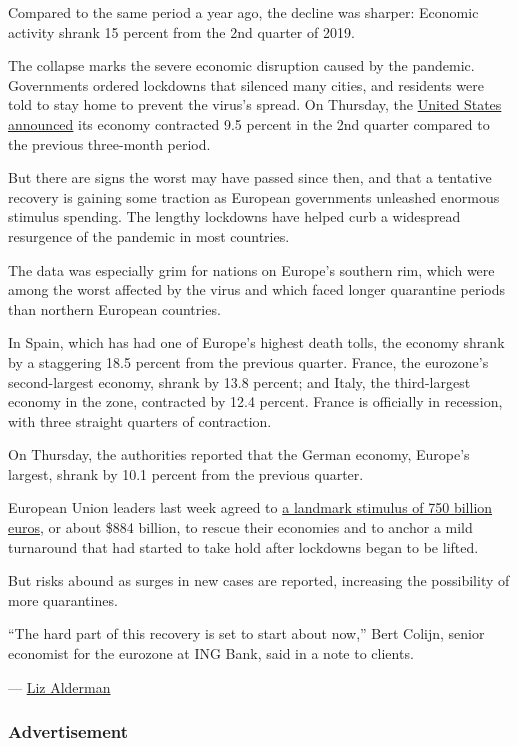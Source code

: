 Compared to the same period a year ago, the decline was sharper:
Economic activity shrank 15 percent from the 2nd quarter of 2019.

The collapse marks the severe economic disruption caused by the
pandemic. Governments ordered lockdowns that silenced many cities, and
residents were told to stay home to prevent the virus's spread. On
Thursday, the
\href{https://www.nytimes.com/2020/07/30/business/economy/q2-gdp-coronavirus-economy.html}{United
States announced} its economy contracted 9.5 percent in the 2nd quarter
compared to the previous three-month period.

But there are signs the worst may have passed since then, and that a
tentative recovery is gaining some traction as European governments
unleashed enormous stimulus spending. The lengthy lockdowns have helped
curb a widespread resurgence of the pandemic in most countries.

The data was especially grim for nations on Europe's southern rim, which
were among the worst affected by the virus and which faced longer
quarantine periods than northern European countries.

In Spain, which has had one of Europe's highest death tolls, the economy
shrank by a staggering 18.5 percent from the previous quarter. France,
the eurozone's second-largest economy, shrank by 13.8 percent; and
Italy, the third-largest economy in the zone, contracted by 12.4
percent. France is officially in recession, with three straight quarters
of contraction.

On Thursday, the authorities reported that the German economy, Europe's
largest, shrank by 10.1 percent from the previous quarter.

European Union leaders last week agreed to
\href{https://www.nytimes.com/2020/07/20/world/europe/eu-stimulus-coronavirus.html}{a
landmark stimulus of 750 billion euros}, or about \$884 billion, to
rescue their economies and to anchor a mild turnaround that had started
to take hold after lockdowns began to be lifted.

But risks abound as surges in new cases are reported, increasing the
possibility of more quarantines.

``The hard part of this recovery is set to start about now,'' Bert
Colijn, senior economist for the eurozone at ING Bank, said in a note to
clients.

--- \href{https://www.nytimes.com/by/liz-alderman}{Liz Alderman}

\hypertarget{advertisement-1}{%
\subsubsection{Advertisement}\label{advertisement-1}}

